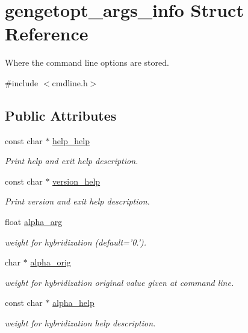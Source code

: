 \hypertarget{structgengetopt__args__info}{\section{gengetopt\+\_\+args\+\_\+info Struct Reference}
\label{structgengetopt__args__info}
}


Where the command line options are stored.  




{\ttfamily \#include $<$cmdline.\+h$>$}

\subsection*{Public Attributes}
\begin{DoxyCompactItemize}
\item 
const char $\ast$ \hyperlink{structgengetopt__args__info_a6497d9a5edee41da66eb109f093781a7}{help\+\_\+help}
\begin{DoxyCompactList}\small\item\em Print help and exit help description. \end{DoxyCompactList}\item 
const char $\ast$ \hyperlink{structgengetopt__args__info_adb4fc9ee66c499d4225d6f6eefbd8c09}{version\+\_\+help}
\begin{DoxyCompactList}\small\item\em Print version and exit help description. \end{DoxyCompactList}\item 
float \hyperlink{structgengetopt__args__info_a502d24814b53a2197444e3ef7f5af837}{alpha\+\_\+arg}
\begin{DoxyCompactList}\small\item\em weight for hybridization (default='0.'). \end{DoxyCompactList}\item 
char $\ast$ \hyperlink{structgengetopt__args__info_a764f3e0a251f142ad756912a7f8e43a2}{alpha\+\_\+orig}
\begin{DoxyCompactList}\small\item\em weight for hybridization original value given at command line. \end{DoxyCompactList}\item 
const char $\ast$ \hyperlink{structgengetopt__args__info_a9c0b0c04fb015f10016df0054a8ce4f6}{alpha\+\_\+help}
\begin{DoxyCompactList}\small\item\em weight for hybridization help description. \end{DoxyCompactList}\item 

\end{DoxyCompactItemize}
